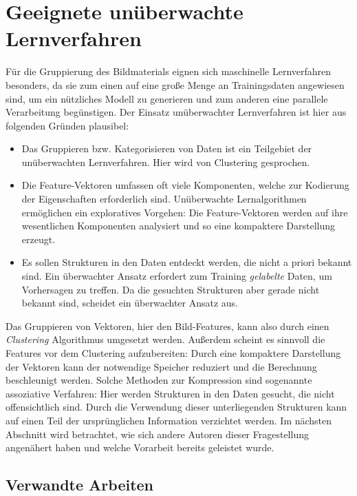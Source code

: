 \section{Geeignete unüberwachte Lernverfahren}

Für die Gruppierung des Bildmaterials eignen sich maschinelle Lernverfahren besonders, da sie zum einen auf eine große Menge an Trainingsdaten angewiesen sind, um ein nützliches Modell zu generieren und zum anderen eine parallele Verarbeitung begünstigen. Der Einsatz unüberwachter Lernverfahren ist hier aus folgenden Gründen plausibel:

\begin{itemize}
	\item Das Gruppieren bzw. Kategorisieren von Daten ist ein Teilgebiet der unüberwachten Lernverfahren. Hier wird von Clustering gesprochen.
	\item Die Feature-Vektoren umfassen oft viele Komponenten, welche zur Kodierung der Eigenschaften erforderlich sind. Unüberwachte Lernalgorithmen ermöglichen ein exploratives Vorgehen: Die Feature-Vektoren werden auf ihre wesentlichen Komponenten analysiert und so eine kompaktere Darstellung erzeugt.
	\item Es sollen Strukturen in den Daten entdeckt werden, die nicht a priori bekannt sind. Ein überwachter Ansatz erfordert zum Training \textit{gelabelte} Daten, um Vorhersagen zu treffen. Da die gesuchten Strukturen aber gerade nicht bekannt sind, scheidet ein überwachter Ansatz aus.
\end{itemize}

Das Gruppieren von Vektoren, hier den Bild-Features, kann also durch einen \textit{Clustering} Algorithmus umgesetzt werden. Außerdem scheint es sinnvoll die Features vor dem Clustering aufzubereiten: Durch eine kompaktere Darstellung der Vektoren kann der notwendige Speicher reduziert und die Berechnung beschleunigt werden. Solche Methoden zur Kompression sind sogenannte assoziative Verfahren: Hier werden Strukturen in den Daten gesucht, die nicht offensichtlich sind. Durch die Verwendung dieser unterliegenden Strukturen kann auf einen Teil der ursprünglichen Information verzichtet werden. Im nächsten Abschnitt wird betrachtet, wie sich andere Autoren dieser Fragestellung angenähert haben und welche Vorarbeit bereits geleistet wurde.

\subsection{Verwandte Arbeiten}

